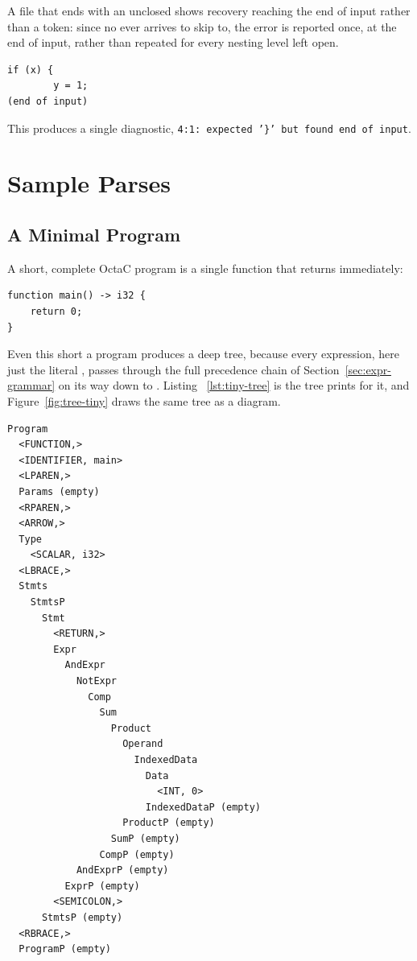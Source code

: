 A file that ends with an unclosed  shows recovery reaching the end
of input rather than a token: since no \code{\}} ever arrives to skip to,
the error is reported once, at the end of input, rather than repeated for
every nesting level left open.

\begin{lstlisting}[style=pseudocode]
    if (x) {
        y = 1;
(end of input)
\end{lstlisting}

\begin{sloppypar}
This produces a single diagnostic, \texttt{4:1: expected '\}' but found end
of input}.
\end{sloppypar}

\section{Sample Parses}

\subsection{A Minimal Program}

A short, complete OctaC program is a single function that returns
immediately:

\begin{lstlisting}
function main() -> i32 {
    return 0;
}
\end{lstlisting}

Even this short a program produces a deep tree, because every expression,
here just the literal , passes through the full precedence chain
of Section~\ref{sec:expr-grammar} on its way down to . Listing~
\ref{lst:tiny-tree} is the tree  prints for it, and
Figure~\ref{fig:tree-tiny} draws the same tree as a diagram.

\begin{lstlisting}[style=pseudocode,
    caption={The parse tree of the program above.}, label=lst:tiny-tree]
Program
  <FUNCTION,>
  <IDENTIFIER, main>
  <LPAREN,>
  Params (empty)
  <RPAREN,>
  <ARROW,>
  Type
    <SCALAR, i32>
  <LBRACE,>
  Stmts
    StmtsP
      Stmt
        <RETURN,>
        Expr
          AndExpr
            NotExpr
              Comp
                Sum
                  Product
                    Operand
                      IndexedData
                        Data
                          <INT, 0>
                        IndexedDataP (empty)
                    ProductP (empty)
                  SumP (empty)
                CompP (empty)
            AndExprP (empty)
          ExprP (empty)
        <SEMICOLON,>
      StmtsP (empty)
  <RBRACE,>
  ProgramP (empty)\end{lstlisting}

